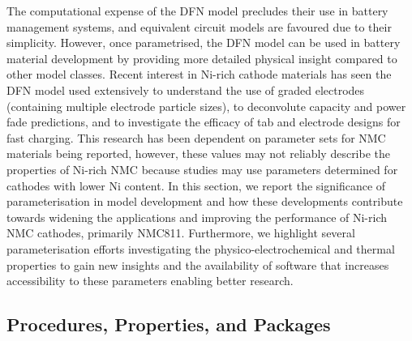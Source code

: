 \documentclass[aps,prb,twocolumn,superscriptaddress,reprint]{revtex4-1}
\begin{document}
The computational expense of the DFN model precludes their use in battery management systems, and equivalent circuit models are favoured due to their simplicity.\cite{Marquis2019} However, once parametrised, the DFN model can be used in battery material development by providing more detailed physical insight compared to other model classes.\cite{Dawson2018} Recent interest in Ni-rich cathode materials has seen the DFN model used extensively to understand the use of graded electrodes (containing multiple electrode particle sizes), to deconvolute capacity and power fade predictions, and to investigate the efficacy of tab and electrode designs for fast charging.\cite{Richardson2020,Kindermann2017,Sturm2019} This research has been dependent on parameter sets for NMC materials being reported, however, these values may not reliably describe the properties of Ni-rich NMC because studies may use parameters determined for cathodes with lower Ni content. In this section, we report the significance of parameterisation in model development and how these developments contribute towards widening the applications and improving the performance of Ni-rich NMC cathodes, primarily NMC811. Furthermore, we highlight several parameterisation efforts investigating the physico-electrochemical and thermal properties to gain new insights and the availability of software that increases accessibility to these parameters enabling better research. 

\subsection{Procedures, Properties, and Packages}
\end{document}
